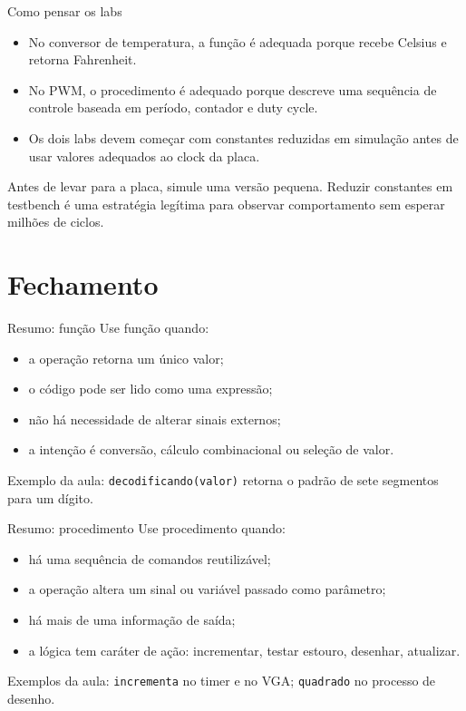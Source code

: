 \documentclass[aspectratio=169,11pt]{beamer}
\begin{document}
\begin{frame}{Como pensar os labs}
    \begin{itemize}
        \item No conversor de temperatura, a função é adequada porque recebe Celsius e retorna Fahrenheit.
        \item No PWM, o procedimento é adequado porque descreve uma sequência de controle baseada em período, contador e duty cycle.
        \item Os dois labs devem começar com constantes reduzidas em simulação antes de usar valores adequados ao clock da placa.
    \end{itemize}

    \vspace{0.5em}
    Antes de levar para a placa, simule uma versão pequena. Reduzir constantes em testbench é uma estratégia legítima para observar comportamento sem esperar milhões de ciclos.
\end{frame}

\section{Fechamento}

\begin{frame}{Resumo: função}
    Use função quando:
    \begin{itemize}
        \item a operação retorna um único valor;
        \item o código pode ser lido como uma expressão;
        \item não há necessidade de alterar sinais externos;
        \item a intenção é conversão, cálculo combinacional ou seleção de valor.
    \end{itemize}

    \vspace{0.5em}
    Exemplo da aula: \texttt{decodificando(valor)} retorna o padrão de sete segmentos para um dígito.
\end{frame}

\begin{frame}{Resumo: procedimento}
    Use procedimento quando:
    \begin{itemize}
        \item há uma sequência de comandos reutilizável;
        \item a operação altera um sinal ou variável passado como parâmetro;
        \item há mais de uma informação de saída;
        \item a lógica tem caráter de ação: incrementar, testar estouro, desenhar, atualizar.
    \end{itemize}

    \vspace{0.5em}
    Exemplos da aula: \texttt{incrementa} no timer e no VGA; \texttt{quadrado} no processo de desenho.
\end{frame}
\end{document}
